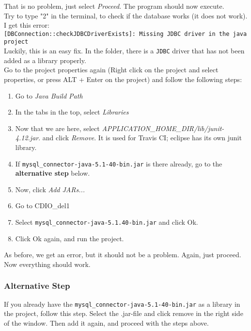 \noindent That is no problem, just select \textit{Proceed}. The program should now execute. \\
Try to type "2" in the terminal, to check if the database works (it does not work). I get this error:\\
\texttt{[DBConnection::checkJDBCDriverExists]: Missing JDBC driver in the java project}\\
Luckily, this is an easy fix. In the folder, there is a \texttt{JDBC} driver that has not been added as a library properly.\\
Go to the project properties again (Right click on the project and select properties, or press ALT + Enter on the project) and follow the following steps:

\begin{enumerate}
    \item Go to \textit{Java Build Path}
    \item In the tabs in the top, select \textit{Libraries}
    \item Now that we are here, select \textit{APPLICATION\_HOME\_DIR/lib/junit-4.12.jar}. and click \textit{Remove}. It is used for Travis CI; eclipse has its own junit library.
    \item If \texttt{mysql\_connector-java-5.1-40-bin.jar} is there already, go to the \textbf{alternative step} below.
    \item Now, click \textit{Add JARs...}
    \item Go to CDIO\_del1
    \item Select \texttt{mysql\_connector-java-5.1.40-bin.jar} and click Ok.
    \item Click Ok again, and run the project.
\end{enumerate}
As before, we get an error, but it should not be a problem. Again, just proceed.\\
Now everything should work. 

\subsubsection{Alternative Step}

If you already have the \texttt{mysql\_connector-java-5.1-40-bin.jar} as a library in the project, follow this step. Select the .jar-file and click remove in the right side of the window. Then add it again, and proceed with the steps above.